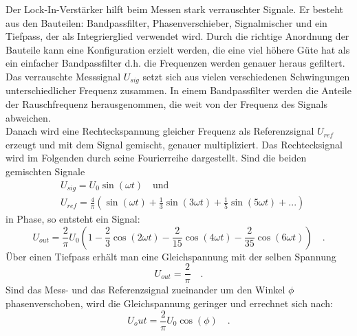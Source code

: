 Der Lock-In-Verstärker  hilft beim Messen stark verrauschter Signale. Er besteht aus den Bauteilen:
 Bandpassfilter, Phasenverschieber, Signalmischer und ein Tiefpass, der als Integrierglied verwendet wird. Durch die richtige Anordnung der Bauteile kann eine Konfiguration erzielt werden, die eine viel höhere Güte hat als ein einfacher Bandpassfilter d.h. die Frequenzen werden genauer heraus gefiltert. \\
 Das verrauschte Messsignal $U_{sig}$ setzt sich aus vielen verschiedenen Schwingungen unterschiedlicher Frequenz zusammen. In einem Bandpassfilter werden die Anteile der Rauschfrequenz herausgenommen, die weit von der Frequenz des Signals abweichen. \\
 Danach wird eine Rechteckspannung gleicher Frequenz als Referenzsignal $U_{ref}$ erzeugt und mit dem Signal gemischt, genauer multipliziert. Das Rechtecksignal wird im Folgenden durch seine Fourierreihe dargestellt. Sind die beiden gemischten Signale
 \begin{align}
 &U_{sig} = U_0  \sin(\omega t) \quad \text{und} \\
 &U_{ref} = \frac{4}{\pi} \left(\sin(\omega t ) + \frac{1}{3} \sin(3 \omega t) + \frac{1}{5} \sin{(5 \omega t)} + ... \right)
 \end{align}
 in Phase, so entsteht ein Signal:
 \begin{equation}
 U_{out} = \frac{2}{\pi}  U_0 \left( 1- \frac{2}{3} \cos{(2 \omega t)} - \frac{2}{15} \cos{(4 \omega t)} - \frac{2}{35} \cos{(6 \omega t)} \right) \quad.
 \end{equation}
 Über einen Tiefpass erhält man eine Gleichspannung mit der selben Spannung 
 \begin{equation}
 U_{out} = \frac{2}{\pi} \quad .
 \end{equation}
 Sind das Mess- und das Referenzsignal zueinander  um den Winkel $\phi$ phasenverschoben, wird die Gleichspannung geringer und errechnet sich nach:
 \begin{equation}\label{Ausgangssignal}
 U_out = \frac{2}{\pi} U_0 \cos{(\phi)} \quad.
 \end{equation}
 	